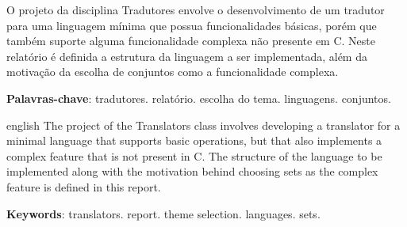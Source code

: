 \documentclass[
	article,			%
	11pt,				%
	oneside,			%
	a4paper,			%
	english,			%
	brazil,				%
	sumario=tradicional
	]{abntex2}
\begin{document}

\frenchspacing 


%
%

\maketitle





\begin{resumoumacoluna}
	O projeto da disciplina Tradutores envolve o desenvolvimento de
	um tradutor para uma linguagem mínima que possua funcionalidades
	básicas, porém que também suporte alguma funcionalidade complexa
	não presente em C. Neste relatório é definida a estrutura da
	linguagem a ser implementada, além da motivação da escolha de
	conjuntos como a funcionalidade complexa.
	
	\vspace{\onelineskip}
	 
	\noindent
	\textbf{Palavras-chave}: tradutores. relatório. 
	escolha do tema. linguagens. conjuntos.
\end{resumoumacoluna}


\renewcommand{\resumoname}{Abstract}
\begin{resumoumacoluna}
	\begin{otherlanguage*}{english}
		The project of the Translators class involves developing a
		translator for a minimal language that supports basic operations,
		but that also implements a complex feature that is not present
		in C. The structure of the language to be implemented along with
		the motivation behind choosing sets as the complex feature is
		defined in this report.	
		\vspace{\onelineskip}
		 
		\noindent
		\textbf{Keywords}: translators. report. theme selection.
		languages. sets.
	\end{otherlanguage*}  
\end{resumoumacoluna}
\end{document}
